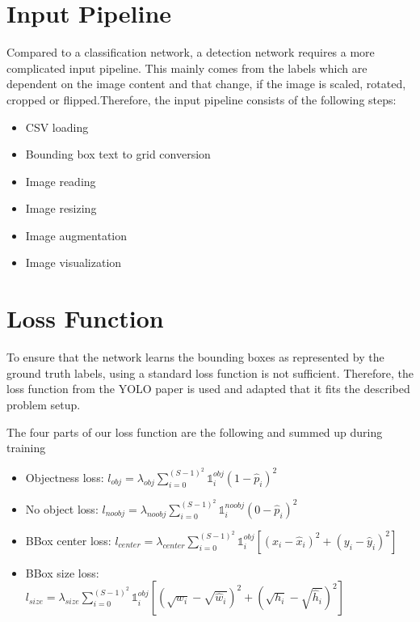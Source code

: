 \documentclass[landscape,a2,final,10pt]{issposter}
\begin{document}
\begin{multicols}{3}
\section{Input Pipeline}
        \begin{small}Compared to a classification network, a detection network requires a more complicated input pipeline. This mainly comes from the 
        labels which are dependent on the image content and that change, if the image is scaled, rotated, cropped or flipped.Therefore, the input pipeline consists of the following steps:
        \begin{itemize}
            \item CSV loading
            \item Bounding box text to grid conversion
            \item Image reading
            \item Image resizing
            \item Image augmentation
            \item Image visualization
        \end{itemize}
        \end{small}
       
    \columnbreak
    \section{Loss Function}
        \begin{small} To ensure that the network learns the bounding boxes as represented by the ground truth labels, 
        using a standard loss function is not sufficient. Therefore, the loss function from the YOLO paper is used and adapted 
        that it fits the described problem setup.
        
        
        The four parts of our loss function are the following and summed up during training 
        \begin{itemize}
            \item Objectness loss: \quad $l_{obj} = \lambda_{obj} \sum_{i=0}^{(S-1)^2} \mathds{1}_{i}^{obj} (1 - \hat{p}_i)^2  $
            \item No object loss: \quad \quad $l_{noobj} = \lambda_{noobj} \sum_{i=0}^{(S-1)^2} \mathds{1}_{i}^{noobj} (0 - \hat{p}_i)^2  $
            \item BBox center loss: \quad $l_{center} = \lambda_{center} \sum_{i=0}^{(S-1)^2} \mathds{1}_{i}^{obj} [(x_i - \hat{x}_i)^2 + (y_i - \hat{y}_i)^2] $
            \item BBox size loss: \quad \quad$l_{size} = \lambda_{size} \sum_{i=0}^{(S-1)^2} \mathds{1}_{i}^{obj} [(\sqrt{w_i} - \sqrt{\hat{w}_i})^2 + (\sqrt{h_i} - \sqrt{\hat{h}_i})^2] $
        \end{itemize}


\end{small}
\end{multicols}
\end{document}
